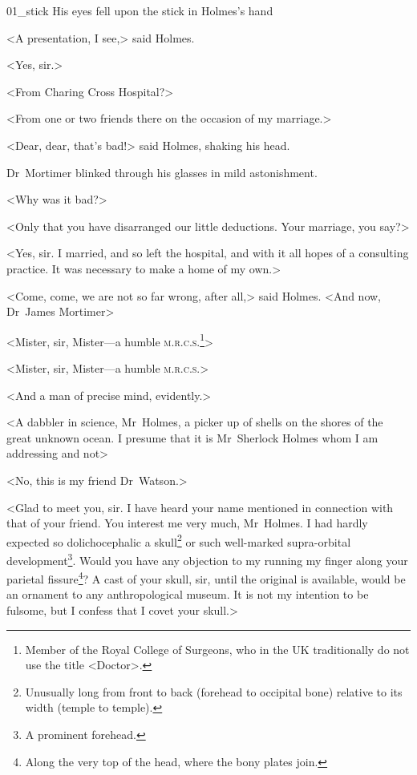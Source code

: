 \begin{bwbigpic}
	[1.0] 
	{01_stick}
	{His eyes fell upon the stick in Holmes's hand}
\end{bwbigpic}

<A presentation, I see,> said Holmes.

<Yes, sir.>

<From Charing Cross Hospital?>

<From one or two friends there on the occasion of my marriage.>

<Dear, dear, that's bad!> said Holmes, shaking his head.

Dr~Mortimer blinked through his glasses in mild astonishment.

<Why was it bad?>

<Only that you have disarranged our little deductions. Your marriage, you say?>

<Yes, sir. I married, and so left the hospital, and with it all hopes of a consulting practice. It was necessary to make a home of my own.>

<Come, come, we are not so far wrong, after all,> said Holmes. <And now, Dr~James Mortimer\longdash>

\begin{withfootnotes}
<Mister, sir, Mister—a humble \textsc{m.r.c.s.}\footnote{Member of the Royal College of Surgeons, who in the UK traditionally do not use the title <Doctor>.}>
\end{withfootnotes}

\begin{withoutfootnotes}
<Mister, sir, Mister—a humble \textsc{m.r.c.s.}>
\end{withoutfootnotes}

<And a man of precise mind, evidently.>

<A dabbler in science, Mr~Holmes, a picker up of shells on the shores of the great unknown ocean. I presume that it is Mr~Sherlock Holmes whom I am addressing and not\longdash>

<No, this is my friend Dr~Watson.>

\begin{withfootnotes}
<Glad to meet you, sir. I have heard your name mentioned in connection with that of your friend. You interest me very much, Mr~Holmes. I had hardly expected so dolichocephalic a skull\footnote{Unusually long from front to back (forehead to occipital bone) relative to its width (temple to temple).} or such well-marked supra-orbital development\footnote{A prominent forehead.}. Would you have any objection to my running my finger along your parietal fissure\footnote{Along the very top of the head, where the bony plates join.}? A cast of your skull, sir, until the original is available, would be an ornament to any anthropological museum. It is not my intention to be fulsome, but I confess that I covet your skull.>
\end{withfootnotes}

